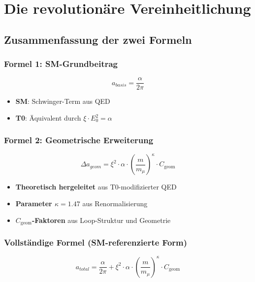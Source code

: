 \documentclass[12pt,a4paper]{article}
\numberwithin{equation}{section}
\newcommand{\xipar}{\xi}
\newcommand{\Cgeom}{C_{\text{geom}}}
\newcommand{\kappaT}{\kappa}
\newcommand{\mmu}{m_{\mu}}
\begin{document}
	\section{Die revolutionäre Vereinheitlichung}
	
	\subsection{Zusammenfassung der zwei Formeln}
	
	\subsubsection{Formel 1: SM-Grundbeitrag}
	
	\begin{equation}
		a_{basis} = \frac{\alpha}{2\pi}
	\end{equation}
	
	\begin{itemize}
		\item \textbf{SM}: Schwinger-Term aus QED
		\item \textbf{T0}: Äquivalent durch $\xipar \cdot E_0^2 = \alpha$
	\end{itemize}
	
	\subsubsection{Formel 2: Geometrische Erweiterung}
	
	\begin{equation}
		\Delta a_{geom} = \xipar^2 \cdot \alpha \cdot \left(\frac{m}{\mmu}\right)^\kappaT \cdot \Cgeom
	\end{equation}
	
	\begin{itemize}
		\item \textbf{Theoretisch hergeleitet} aus T0-modifizierter QED
		\item \textbf{Parameter $\kappaT = 1.47$} aus Renormalisierung
		\item \textbf{$\Cgeom$-Faktoren} aus Loop-Struktur und Geometrie
	\end{itemize}
	
	\subsubsection{Vollständige Formel (SM-referenzierte Form)}
	
	\begin{equation}
		\boxed{a_{total} = \frac{\alpha}{2\pi} + \xipar^2 \cdot \alpha \cdot \left(\frac{m}{\mmu}\right)^\kappaT \cdot \Cgeom}
	\end{equation}
	
\end{document}
